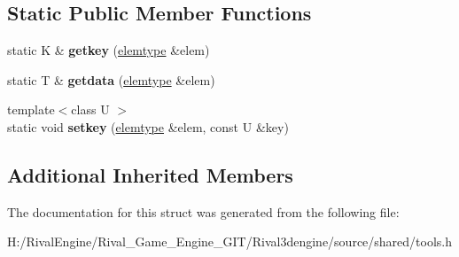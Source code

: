 \subsection*{Static Public Member Functions}
\begin{DoxyCompactItemize}
\item 
\mbox{\label{structhashtable_a8d0073175cc7bcf13bbafa1d95da9105}} 
static K \& {\bfseries getkey} (\hyperlink{structhashtableentry}{elemtype} \&elem)
\item 
\mbox{\label{structhashtable_aec9573e5c4052c0d78ab73750a000df8}} 
static T \& {\bfseries getdata} (\hyperlink{structhashtableentry}{elemtype} \&elem)
\item 
\mbox{\label{structhashtable_ac4d28d6bfb1fc1203ee98d648a32d53a}} 
{\footnotesize template$<$class U $>$ }\\static void {\bfseries setkey} (\hyperlink{structhashtableentry}{elemtype} \&elem, const U \&key)
\end{DoxyCompactItemize}
\subsection*{Additional Inherited Members}


The documentation for this struct was generated from the following file\+:\begin{DoxyCompactItemize}
\item 
H\+:/\+Rival\+Engine/\+Rival\+\_\+\+Game\+\_\+\+Engine\+\_\+\+G\+I\+T/\+Rival3dengine/source/shared/tools.\+h\end{DoxyCompactItemize}
